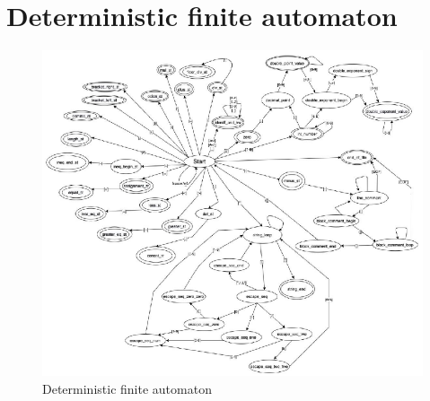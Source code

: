 \documentclass[11pt]{article}
\begin{document}
\section{Deterministic finite automaton}
\begin{figure}[ht]
    \centering
    \includegraphics[width=0.95\linewidth]{finite_lexical_automat.eps}
    \caption{Deterministic finite automaton}
    \label{lexical_automat}
\end{figure}

\newpage
\end{document}
